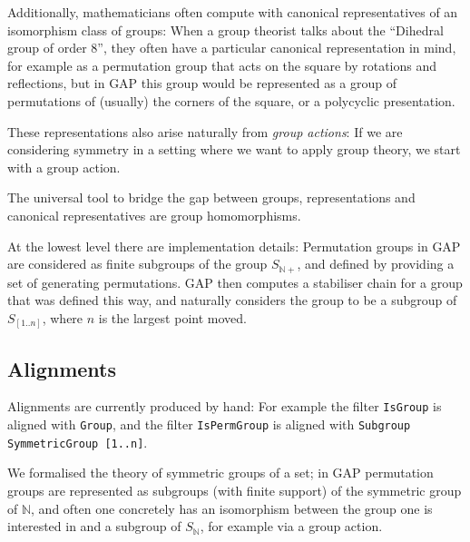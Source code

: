 Additionally, mathematicians often compute with canonical representatives of an
isomorphism class of groups: When a group theorist talks about the ``Dihedral
group of order 8'', they often have a particular canonical representation in
mind, for example as a permutation group that acts on the square by rotations
and reflections, but in GAP this group would be represented as a group of
permutations of (usually) the corners of the square, or a polycyclic
presentation.

These representations also arise naturally from \emph{group actions}: If we are
considering symmetry in a setting where we want to apply group theory, we start
with a group action.

The universal tool to bridge the gap between groups, representations and
canonical representatives are group homomorphisms.

\medskip

At the lowest level there are implementation details: Permutation groups in GAP
are considered as finite subgroups of the group $S_{\mathbb{N}+}$, and defined by
providing a set of generating permutations. GAP then computes a stabiliser chain
for a group that was defined this way, and naturally considers the group to be a
subgroup of $S_{[1..n]}$, where $n$ is the largest point moved.


\subsection{Alignments}

Alignments are currently produced by hand: 
For example the filter \texttt{IsGroup} is aligned with \texttt{Group}, and the
filter \texttt{IsPermGroup} is aligned with \texttt{Subgroup SymmetricGroup
  [1..n]}.

We formalised the theory of symmetric groups of a set; in GAP permutation groups
are represented as subgroups (with finite support) of the symmetric group of
$\mathbb{N}$, and often one concretely has an isomorphism between the group one
is interested in and a subgroup of $S_{\mathbb{N}}$, for example
via a group action.

